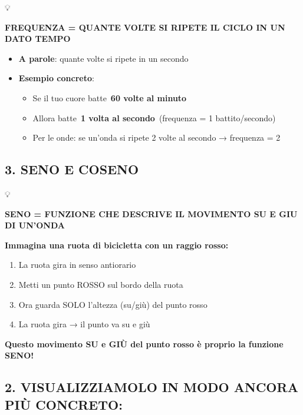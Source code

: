 \documentclass[
]{article}
\providecommand{\tightlist}{%
  \setlength{\itemsep}{0pt}\setlength{\parskip}{0pt}}
\begin{document}
💡

\textbf{FREQUENZA = QUANTE VOLTE SI RIPETE IL CICLO IN UN DATO TEMPO}

\begin{itemize}
\tightlist
\item
  \textbf{A parole}: quante volte si ripete in un secondo
\item
  \textbf{Esempio concreto}:

  \begin{itemize}
  \tightlist
  \item
    Se il tuo cuore batte~\textbf{60 volte al minuto}
  \item
    Allora batte~\textbf{1 volta al secondo}~(frequenza = 1 battito/secondo)
  \item
    Per le onde: se un'onda si ripete 2 volte al secondo → frequenza = 2
  \end{itemize}
\end{itemize}

\hypertarget{seno-e-coseno}{%
\subsection{3. SENO E COSENO}\label{seno-e-coseno}}

💡

\textbf{SENO = FUNZIONE CHE DESCRIVE IL MOVIMENTO SU E GIU DI UN'ONDA}

\textbf{Immagina una ruota di bicicletta con un raggio rosso:}

\begin{enumerate}
\def\labelenumi{\arabic{enumi}.}
\tightlist
\item
  La ruota gira in senso antiorario
\item
  Metti un punto ROSSO sul bordo della ruota
\item
  Ora guarda SOLO l'altezza (su/giù) del punto rosso
\item
  La ruota gira → il punto va su e giù
\end{enumerate}

\textbf{Questo movimento SU e GIÙ del punto rosso è proprio la funzione SENO!}

\hypertarget{visualizziamolo-in-modo-ancora-piuxf9-concreto}{%
\subsection{\texorpdfstring{\textbf{2. VISUALIZZIAMOLO IN MODO ANCORA PIÙ CONCRETO:}}{2. VISUALIZZIAMOLO IN MODO ANCORA PIÙ CONCRETO:}}\label{visualizziamolo-in-modo-ancora-piuxf9-concreto}}
\end{document}
